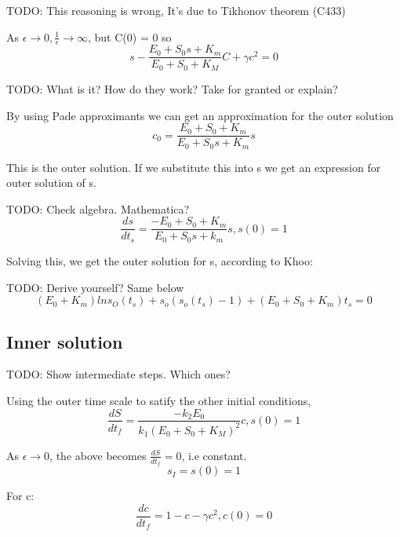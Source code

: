 \documentclass[12pt]{article}
\begin{document}
TODO: This reasoning is wrong, It's due to Tikhonov theorem (C433)

As $\epsilon \to 0, \frac{1}{\epsilon} \to \infty$, but C(0) = 0 so
\begin{equation}
s - \frac{E_0 + S_0 s + K_m}{E_0 + S_0 + K_M}C + \gamma c^2 = 0
\end{equation}

TODO: What is it? How do they work? Take for granted or explain?

By using Pade approximants we can get an approximation for the outer
solution
\begin{equation}
c_0  = \frac{E_0 + S_0 + K_m}{E_0 + S_0 s + K_m} s
\end{equation}

This is the outer solution. If we substitute this into s we get an
expression for outer solution of s.

TODO: Check algebra. Mathematica?
\begin{equation}
\frac{ds}{dt_s} = \frac{-E_0 + S_0 + K_m}{E_0 + S_0s + k_m}s, s(0) = 1
\end{equation}

Solving this, we get the outer solution for s, according to Khoo:

TODO: Derive yourself? Same below
\begin{equation}
(E_0 + K_m) ln s_O(t_s) + s_o(s_o(t_s) - 1) + (E_0 + S_0 + K_m) t_s = 0
\end{equation}

\subsection{Inner solution}

TODO: Show intermediate steps. Which ones?

Using the outer time scale to satify the other initial conditions,
\begin{equation}
\frac{dS}{dt_f} = \frac{-k_2 E_0}{k_1(E_0 + S_0 + K_M)^2} c, s(0) = 1
\end{equation}

As $\epsilon \to 0$, the above becomes $\frac{dS}{dt_f} = 0$, i.e constant.
\begin{equation}
s_I = s(0) = 1
\end{equation}

For c:
\begin{equation}
\frac{dc}{dt_f} = 1 - c - \gamma c^2, c(0)=0
\end{equation}
\end{document}

